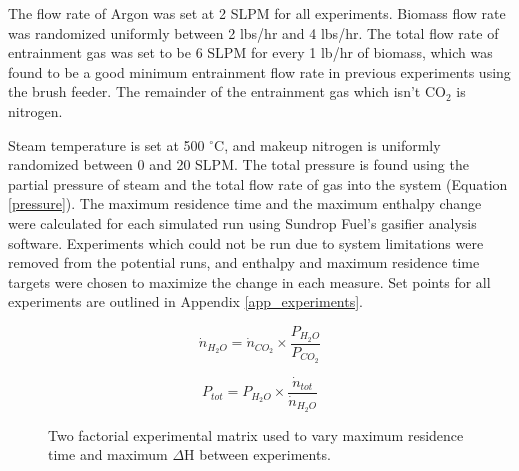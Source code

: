 \documentclass[11pt,twocolumn]{article}
\begin{document}
The flow rate of Argon was set at 2 SLPM for all experiments.  Biomass flow rate was randomized uniformly between 2 lbs/hr and 4 lbs/hr.  The total flow rate of entrainment gas was set to be 6 SLPM for every 1 lb/hr of biomass, which was found to be a good minimum entrainment flow rate in previous experiments using the brush feeder.  The remainder of the entrainment gas which isn't CO$_2$ is nitrogen.

Steam temperature is set at 500 $^\circ$C, and makeup nitrogen is uniformly randomized between 0 and 20 SLPM.  The total pressure is found using the partial pressure of steam and the total flow rate of gas into the system (Equation \ref{pressure}).  The maximum residence time and the maximum enthalpy change were calculated for each simulated run using Sundrop Fuel's gasifier analysis software.  Experiments which could not be run due to system limitations were removed from the potential runs, and enthalpy and maximum residence time targets were chosen to maximize the change in each measure.  Set points for all experiments are outlined in Appendix \ref{app_experiments}.

\begin{equation}
	\dot{n}_{H_2O} = \dot{n}_{CO_2} \times \frac{P_{H_2O}}{P_{CO_2}}
	\label{eq_steam}
\end{equation}

\begin{equation}
	P_{tot} = P_{H_2O} \times \frac{\dot{n}_{tot}}{\dot{n}_{H_2O}}
	\label{pressure}
\end{equation}

\begin{figure}
\centering
{}
\caption{Two factorial experimental matrix used to vary maximum residence time and maximum $\Delta$H between experiments.}
\label{factorial}
\end{figure}
\end{document}
